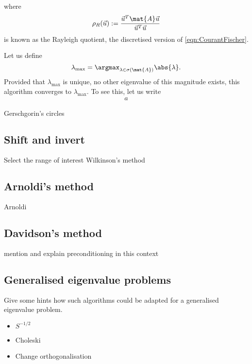 where
\[ \rho_R(\vec{u}) := \frac{\vec{u}^T \mat{A} \vec{u}}{\vec{u}^T \vec{u}} \]
is known as the Rayleigh quotient,
the discretised version of \eqref{eqn:CourantFischer}.

Let us define
\[ \lambda_\text{max} = \argmax_{\lambda \in \sigma(\mat{A})} \abs{\lambda}. \]
Provided that $\lambda_\text{max}$ is unique,
\ie no other eigenvalue of this magnitude exists,
this algorithm converges to $\lambda_\text{max}$.
To see this, let us write
\begin{align}
	a
\end{align}

Gerschgorin's circles



\subsection{Shift and invert}
\label{sec:ShiftInvert}
Select the range of interest
Wilkinson's method

\subsection{Arnoldi's method}
\label{sec:Arnoldi}
Arnoldi~\cite{Arnoldi1951}

\subsection{Davidson's method}
\label{sec:Davidson}

mention and explain preconditioning in this context

\subsection{Generalised eigenvalue problems}
\label{sec:GeneralisedEigenvalueProblem}
Give some hints how such algorithms
could be adapted for a generalised eigenvalue problem.


\begin{itemize}
	\item $S^{-1/2}$
	\item Choleski
	\item Change orthogonalisation
\end{itemize}


